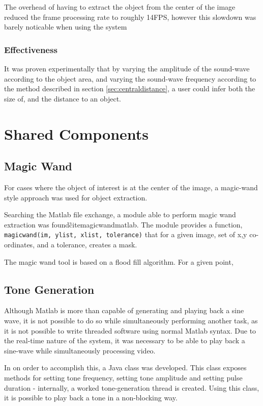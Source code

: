 The overhead of having to extract the object from the center of the image reduced the frame processing rate to roughly 14FPS, however this slowdown was barely noticable when using the system

\subsubsection{Effectiveness}
It was proven experimentally that by varying the amplitude of the sound-wave according to the object area, and varying the sound-wave frequency according to the method described in section \ref{sec:centraldistance}, a user could infer both the size of, and the distance to an object. 

\section{Shared Components}
\label{sec:sharedcomponents}
\subsection{Magic Wand}
\label{sec:magicwand}
For cases where the object of interest is at the center of the image, a magic-wand style approach was used for object extraction. 

Searching the Matlab file exchange, a module able to perform magic wand extraction was found\~cite{magicwandmatlab}. The module provides a function, \texttt{magicwand(im, ylist, xlist, tolerance)} that for a given image, set of {x,y} co-ordinates, and a tolerance, creates a mask.

The magic wand tool is based on a flood fill algorithm. For a given point, 




\subsection{Tone Generation}
Although Matlab is more than capable of generating and playing back a sine wave, it is not possible to do so while simultaneously performing another task, as it is not possible to write threaded software using normal Matlab syntax. Due to the real-time nature of the system, it was necessary to be able to play back a sine-wave while simultaneously processing video.

In on order to accomplish this, a Java class was developed. This class exposes methods for setting tone frequency, setting tone amplitude and setting pulse duration - internally, a worked tone-generation thread is created. Using this class, it is possible to play back a tone in a non-blocking way. 

